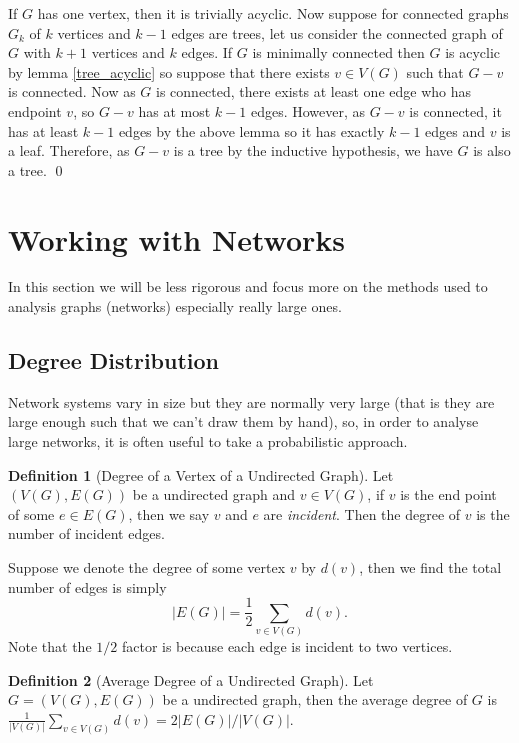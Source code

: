\documentclass[
]{article}
\theoremstyle{definition}
\newtheorem{definition}{Definition}[section]
\begin{document}
If \(G\) has one vertex, then it is trivially acyclic. Now suppose for
connected graphs \(G_k\) of \(k\) vertices and \(k - 1\) edges are
trees, let us consider the connected graph of \(G\) with \(k + 1\)
vertices and \(k\) edges. If \(G\) is minimally connected then \(G\) is
acyclic by lemma \ref{tree_acyclic} so suppose that there exists
\(v \in V(G)\) such that \(G - v\) is connected. Now as \(G\) is
connected, there exists at least one edge who has endpoint \(v\), so
\(G - v\) has at most \(k - 1\) edges. However, as \(G - v\) is
connected, it has at least \(k - 1\) edges by the above lemma so it has
exactly \(k - 1\) edges and \(v\) is a leaf. Therefore, as \(G - v\) is
a tree by the inductive hypothesis, we have \(G\) is also a tree. \qed

\hypertarget{working-with-networks}{%
\section{Working with Networks}\label{working-with-networks}}

In this section we will be less rigorous and focus more on the methods
used to analysis graphs (networks) especially really large ones.

\hypertarget{degree-distribution}{%
\subsection{Degree Distribution}\label{degree-distribution}}

Network systems vary in size but they are normally very large (that is
they are large enough such that we can't draw them by hand), so, in
order to analyse large networks, it is often useful to take a
probabilistic approach.

\begin{definition}[Degree of a Vertex of a Undirected Graph]
  Let \((V(G), E(G))\) be a undirected graph and \(v \in V(G)\), if \(v\) is the 
  end point of some \(e \in E(G)\), then we say \(v\) and \(e\) are 
  \textit{incident}. Then the degree of \(v\) is the number of incident edges.
\end{definition}

Suppose we denote the degree of some vertex \(v\) by \(d(v)\), then we
find the total number of edges is simply
\[ \left| E(G) \right| = \frac{1}{2} \sum_{v \in V(G)} d(v).\] Note that
the \(1 / 2\) factor is because each edge is incident to two vertices.

\begin{definition}[Average Degree of a Undirected Graph]
  Let \(G = (V(G), E(G))\) be a undirected graph, then the average degree of 
  \(G\) is \(\frac{1}{\left| V(G) \right|} \sum_{v \in V(G)} d(v) = 
  2 \left| E(G) \right| / \left| V(G) \right|\).
\end{definition}
\end{document}
